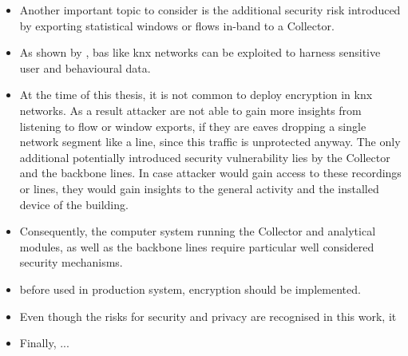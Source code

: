 \begin{itemize}
	\item Another important topic to consider is the additional security risk introduced by exporting statistical windows or flows in-band to a Collector.
	\item As shown by \textcite{Mundt2012}, \gls{bas} like \gls{knx} networks can be exploited to harness sensitive user and behavioural data.
	\item At the time of this thesis, it is not common to deploy encryption in \gls{knx} networks. As a result attacker are not able to gain more insights from listening to flow or window exports, if they are eaves dropping a single network segment like a line, since this traffic is unprotected anyway. The only additional potentially introduced security vulnerability lies by the Collector and the backbone lines. In case attacker would gain access to these recordings or lines, they would gain insights to the general activity and the installed device of the building.
	\item Consequently, the computer system running the Collector and analytical modules, as well as the backbone lines require particular well considered security mechanisms.
	\item before used in production system, encryption should be implemented.
	\item Even though the risks for security and privacy are recognised in this work, it 
	
	\item Finally, ...
	
	
\end{itemize}